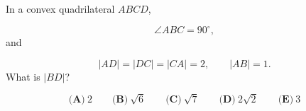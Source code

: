 In a convex quadrilateral \(ABCD\),

\[
\angle ABC = 90^\circ,
\]and

\[
|AD| = |DC| = |CA| = 2, \qquad |AB| = 1.
\]What is \(|BD|\)?



\[
\textbf{(A)}\ 2
\qquad
\textbf{(B)}\ \sqrt{6}
\qquad
\textbf{(C)}\ \sqrt{7}
\qquad
\textbf{(D)}\ 2\sqrt{2}
\qquad
\textbf{(E)}\ 3
\]
